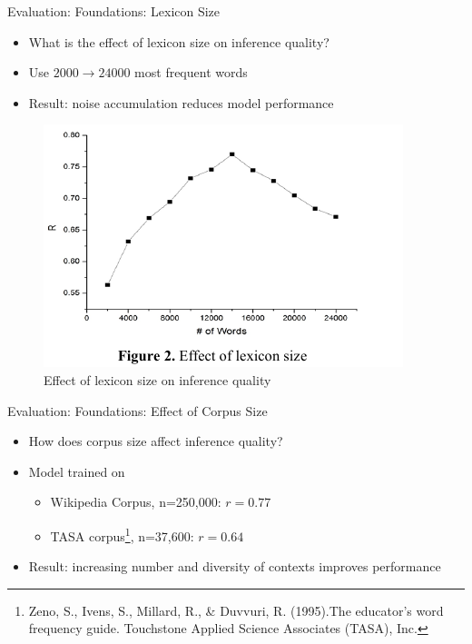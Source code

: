 \documentclass[12pt,a4paper]{beamer}
\begin{document}
\begin{frame}{Evaluation: Foundations: Lexicon Size}
\begin{itemize}
\item What is the effect of lexicon size on inference quality?
\item Use $2000 \to 24000$ most frequent words
\item Result: noise accumulation reduces model performance
\end{itemize}
\begin{figure}
\includegraphics[scale=0.8]{figure_2_effect_of_lexicon_size.png}
\caption{Effect of lexicon size on inference quality}
\end{figure}
\end{frame}


\begin{frame}{Evaluation: Foundations: Effect of Corpus Size}
\begin{itemize}
\item How does corpus size affect inference quality?
\item Model trained on
    \begin{itemize}
    \item Wikipedia Corpus, n=250,000: $r = 0.77$
    \item TASA corpus\footnote{Zeno, S., Ivens, S., Millard, R., \& Duvvuri, R. (1995).The educator’s word frequency guide. Touchstone Applied Science Associates (TASA), Inc.}, n=37,600: $r = 0.64$
%
%
    \end{itemize}
\item Result: increasing number and diversity of contexts improves performance
\end{itemize}
\end{frame}
\end{document}
